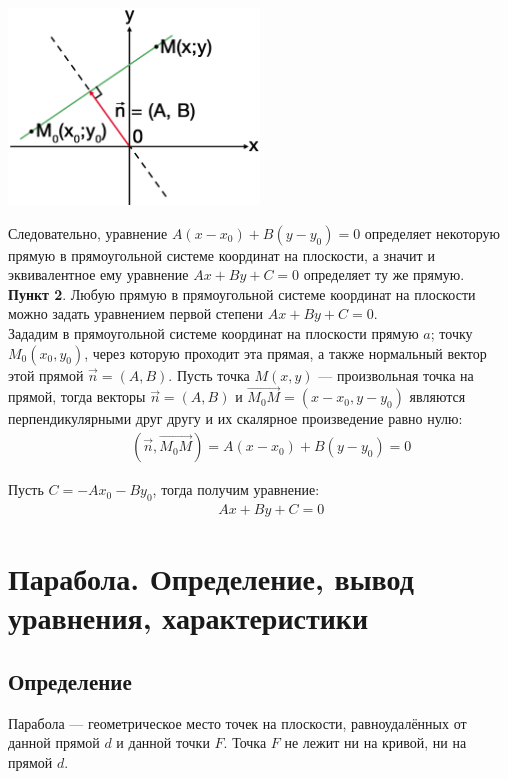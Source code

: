 \documentclass[12pt, fleqn]{extarticle}
\begin{document}
\begin{center}
    \includegraphics[width=0.5\textwidth]{general_line.png}
\end{center}

Следовательно, уравнение \(A(x - x_0) + B(y - y_0) = 0\) определяет некоторую прямую в прямоугольной системе координат на плоскости, а значит и эквивалентное ему уравнение \(Ax + By + C = 0\) определяет ту же прямую. \\

\textbf{Пункт 2}. Любую прямую в прямоугольной системе координат на плоскости можно задать уравнением первой степени \(Ax + By + C = 0\). \\

Зададим в прямоугольной системе координат на плоскости прямую \(a \); точку \(M_0(x_0, y_0)\), через которую проходит эта прямая, а также нормальный вектор этой прямой \(\overrightarrow{n} = (A, B)\).
Пусть точка \(M(x, y)\) — произвольная точка на прямой, тогда векторы \(\overrightarrow{n} = (A, B)\) и \(\overrightarrow{M_0M} = (x - x_0, y - y_0)\) являются перпендикулярными друг другу и их скалярное произведение равно нулю:
\begin{align*}
     &  &
    (\overrightarrow{n}, \overrightarrow{M_0M}) = A(x - x_0) + B(y - y_0) = 0
\end{align*}

Пусть \(C = -Ax_0 - By_0\), тогда получим уравнение:
\begin{align*}
     &  &
    Ax + By + C = 0
\end{align*}



\newpage

\section*{Парабола. Определение, вывод уравнения, характеристики}\label{sec:parabola}

\subsection*{Определение}
Парабола — геометрическое место точек на плоскости, равноудалённых от данной прямой \(d\) и данной точки \(F\).
Точка \(F\) не лежит ни на кривой, ни на прямой \(d\).
\end{document}
